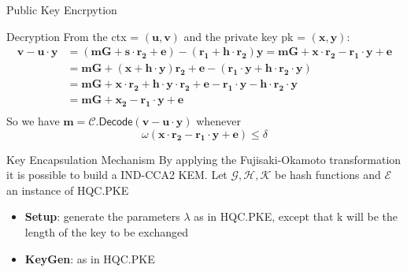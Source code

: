 \begin{frame}{Public Key Encrpytion}
    \begin{block}{Decryption}
        From the \textsf{ctx} = $(\mathbf{u, v})$ and the private key \textsf{pk} = $(\mathbf{x, y})$:
        \begin{equation*}
            \begin{aligned}
                \mathbf{v - u\cdot y} & \mathbf{ = (mG +s\cdot r_2 + e) - (r_1 + h\cdot r_2)y = mG + x\cdot r_2 -r_1\cdot y + e}\\
                &\mathbf{ = mG + (x + h\cdot y)r_2 + e - (r_1\cdot y  + h\cdot r_2\cdot y)}\\
                &\mathbf{ = mG + x\cdot r_2 + h\cdot y\cdot r_2 + e - r_1\cdot y - h\cdot r_2\cdot y}\\
                &\mathbf{ = mG + x_2 - r_1\cdot y + e}\\
            \end{aligned}
        \end{equation*}
        So we have $\mathbf{m} = \mathcal{C}.\textsf{Decode}(\mathbf{v - u\cdot y})$ whenever
        \begin{equation*}
            \omega(\mathbf{x\cdot r_2 - r_1\cdot y + e}) \leq \delta
        \end{equation*}
    \end{block}
\end{frame}

\begin{frame}{Key Encapsulation Mechanism}
    By applying the Fujisaki-Okamoto transformation it is possible to build a IND-CCA2 KEM.
    Let $\mathcal{G, H, K}$ be hash functions and $\mathcal{E}$ an instance of \textsf{HQC.PKE}
    \begin{block}{}
        \begin{itemize}
            \item \textbf{Setup}: generate the parameters $\lambda$ as in \textsf{HQC.PKE}, except that k will be the length of the key to be exchanged
            \item \textbf{KeyGen}: as in \textsf{HQC.PKE}
        \end{itemize}
    \end{block}
\end{frame}

